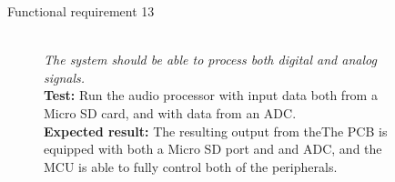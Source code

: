 \begin{figure}[H]
    \label{test:func-test13}
    \begin{description}
        \item[Functional requirement 13] \hfill \\
            \textit{The system should be able to process both digital and analog signals.} \\
            \textbf{Test:} Run the audio processor with input data both from a Micro SD card, and
            with data from an ADC. \\
            \textbf{Expected result:} The resulting output from theThe PCB is equipped with both a Micro SD port and and ADC, and the
            MCU is able to fully control both of the peripherals.\\
    \end{description}
\end{figure}
